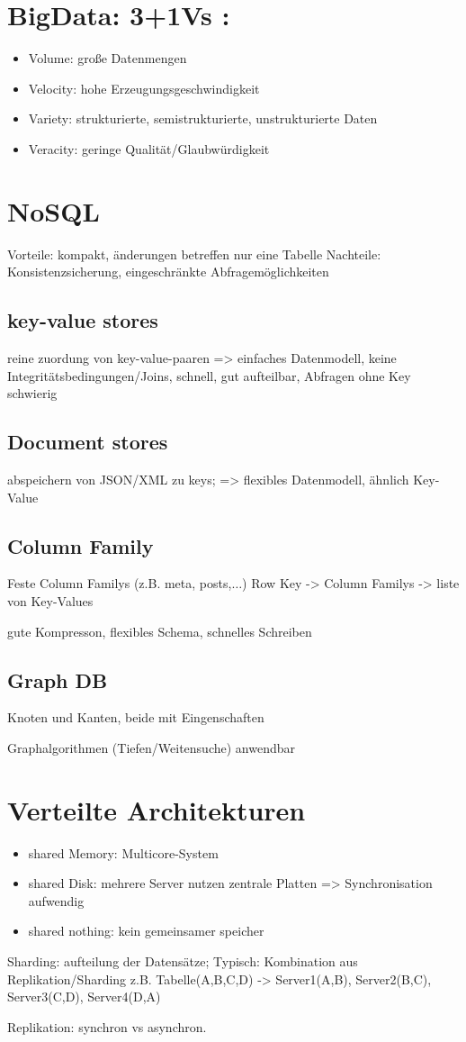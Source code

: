 
\section*{BigData: 3+1Vs : }
\begin{itemize}
\item Volume: große Datenmengen
\item Velocity: hohe Erzeugungsgeschwindigkeit
\item Variety: strukturierte, semistrukturierte, unstrukturierte Daten
\item Veracity: geringe Qualität/Glaubwürdigkeit
\end{itemize}

\section*{NoSQL}
Vorteile: kompakt, änderungen betreffen nur eine Tabelle
Nachteile: Konsistenzsicherung, eingeschränkte Abfragemöglichkeiten
\subsection*{key-value stores}
reine zuordung von key-value-paaren => einfaches Datenmodell, keine Integritätsbedingungen/Joins, schnell, gut aufteilbar, Abfragen ohne Key schwierig

\subsection*{Document stores}
abspeichern von JSON/XML zu keys; => flexibles Datenmodell, ähnlich Key-Value

\subsection*{Column Family}
Feste Column Familys (z.B. meta, posts,$\dots$) 
Row Key -> Column Familys -> liste von Key-Values

gute Kompresson, flexibles Schema, schnelles Schreiben

\subsection*{Graph DB}
Knoten und Kanten, beide mit Eingenschaften

Graphalgorithmen (Tiefen/Weitensuche) anwendbar

\section*{Verteilte Architekturen}
\begin{itemize}
\item shared Memory: Multicore-System
\item shared Disk: mehrere Server nutzen zentrale Platten => Synchronisation aufwendig
\item shared nothing: kein gemeinsamer speicher
\end{itemize}

Sharding: aufteilung der Datensätze; 
Typisch: Kombination aus Replikation/Sharding
z.B. Tabelle(A,B,C,D) -> Server1(A,B), Server2(B,C), Server3(C,D), Server4(D,A)

Replikation: synchron vs asynchron.


